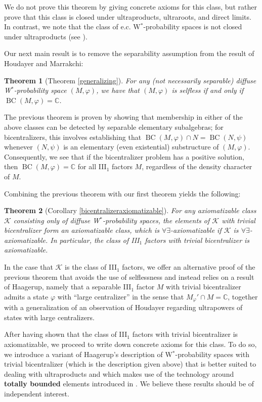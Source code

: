\documentclass[12pt]{amsart}
\newtheorem*{thm*}{Theorem}
\theoremstyle{definition}
\def\bb{\mathbb}
\def\bb{\mathbb}
\def\cal{\mathcal}
\def\BC{\operatorname{BC}}
\begin{document}
We do not prove this theorem by giving concrete axioms for this class, but rather prove that this class is closed under ultraproducts, ultraroots, and direct limits.  In contrast, we note that the class of e.c. W$^*$-probability spaces is not closed under ultraproducts (see \cite[Corollary 3.11]{goldbringhoudayer}).

Our next main result is to remove the separability assumption from the result of Houdayer and Marrakchi:

\begin{thm*}[Theorem \ref{generalizing}]
For any (not necessarily separable) diffuse W$^*$-probability space $(M,\varphi)$, we have that $(M,\varphi)$ is selfless if and only if $\BC(M,\varphi)=\bb C$.
\end{thm*}

The previous theorem is proven by showing that membership in either of the above classes can be detected by separable elementary subalgebras; for bicentralizers, this involves establishing that $\BC(M,\varphi)\cap N=\BC(N,\psi)$ whenever $(N,\psi)$ is an elementary (even existential) substructure of $(M,\varphi)$.  Consequently, we see that if the bicentralizer problem has a positive solution, then $\BC(M,\varphi)=\bb C$ for all III$_1$ factors $M$, regardless of the density character of $M$.

Combining the previous theorem with our first theorem yields the following:

\begin{thm*}[Corollary \ref{bicentralizeraxiomatizable}]
For any axiomatizable class $\cal K$ consisting only of diffuse W$^*$-probability spaces, the elements of $\cal K$ with trivial bicentralizer form an axiomatizable class, which is $\forall\exists$-axiomatizable if $\cal K$ is $\forall\exists$-axiomatizable.  In particular, the class of III$_1$ factors with trivial bicentralizer is axiomatizable.
\end{thm*}

In the case that $\cal K$ is the class of III$_1$ factors, we offer an alternative proof of the previous theorem that avoids the use of selflessness and instead relies on a result of Haagerup, namely that a separable III$_1$ factor $M$ with trivial bicentralizer admits a state $\varphi$ with ``large centralizer'' in the sense that $M_\varphi'\cap M=\bb C$, together with a generalization of an observation of Houdayer regarding ultrapowers of states with large centralizers. 

After having shown that the class of III$_1$ factors with trivial bicentralizer is axiomatizable, we proceed to write down concrete axioms for this class.  To do so, we introduce a variant of Haagerup's description of W$^*$-probability spaces with trivial bicentralizer (which is the description given above) that is better suited to dealing with ultraproducts and which makes use of the technology around \textbf{totally bounded} elements introduced in \cite{AGHS25}.  We believe these results should be of independent interest.
\end{document}

